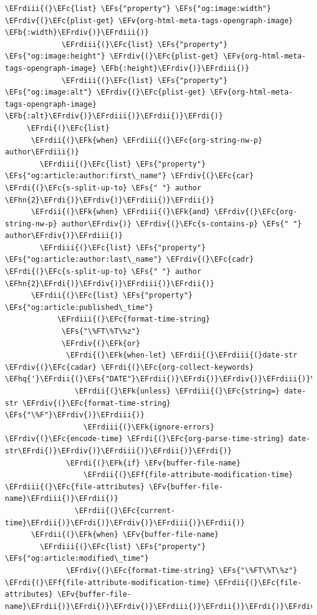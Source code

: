 \documentclass{scrartcl}
\newcommand{\EFk}[1]{\textcolor{EFk}{#1}} %
\newcommand{\EFs}[1]{\textcolor{EFs}{#1}} %
\newcommand{\EFb}[1]{\textcolor{EFb}{#1}} %
\newcommand{\EFc}[1]{\textcolor{EFc}{#1}} %
\newcommand{\EFv}[1]{\textcolor{EFv}{#1}} %
\newcommand{\EFf}[1]{\textcolor{EFf}{#1}} %
\newcommand{\EFhn}[1]{\textcolor{EFhn}{\textbf{#1}}} %
\newcommand{\EFhq}[1]{\textcolor{EFhq}{#1}} %
\newcommand{\EFrdi}[1]{\textcolor{EFrdi}{#1}} %
\newcommand{\EFrdii}[1]{\textcolor{EFrdii}{#1}} %
\newcommand{\EFrdiii}[1]{\textcolor{EFrdiii}{#1}} %
\newcommand{\EFrdiv}[1]{\textcolor{EFrdiv}{#1}} %
\begin{document}
\begin{Code}
\begin{Verbatim}[]
             \EFrdiii{(}\EFc{list} \EFs{"property"} \EFs{"og:image:width"} \EFrdiv{(}\EFc{plist-get} \EFv{org-html-meta-tags-opengraph-image} \EFb{:width}\EFrdiv{)}\EFrdiii{)}
             \EFrdiii{(}\EFc{list} \EFs{"property"} \EFs{"og:image:height"} \EFrdiv{(}\EFc{plist-get} \EFv{org-html-meta-tags-opengraph-image} \EFb{:height}\EFrdiv{)}\EFrdiii{)}
             \EFrdiii{(}\EFc{list} \EFs{"property"} \EFs{"og:image:alt"} \EFrdiv{(}\EFc{plist-get} \EFv{org-html-meta-tags-opengraph-image} \EFb{:alt}\EFrdiv{)}\EFrdiii{)}\EFrdii{)}\EFrdi{)}
     \EFrdi{(}\EFc{list}
      \EFrdii{(}\EFk{when} \EFrdiii{(}\EFc{org-string-nw-p} author\EFrdiii{)}
        \EFrdiii{(}\EFc{list} \EFs{"property"} \EFs{"og:article:author:first\_name"} \EFrdiv{(}\EFc{car} \EFrdi{(}\EFc{s-split-up-to} \EFs{" "} author \EFhn{2}\EFrdi{)}\EFrdiv{)}\EFrdiii{)}\EFrdii{)}
      \EFrdii{(}\EFk{when} \EFrdiii{(}\EFk{and} \EFrdiv{(}\EFc{org-string-nw-p} author\EFrdiv{)} \EFrdiv{(}\EFc{s-contains-p} \EFs{" "} author\EFrdiv{)}\EFrdiii{)}
        \EFrdiii{(}\EFc{list} \EFs{"property"} \EFs{"og:article:author:last\_name"} \EFrdiv{(}\EFc{cadr} \EFrdi{(}\EFc{s-split-up-to} \EFs{" "} author \EFhn{2}\EFrdi{)}\EFrdiv{)}\EFrdiii{)}\EFrdii{)}
      \EFrdii{(}\EFc{list} \EFs{"property"} \EFs{"og:article:published\_time"}
            \EFrdiii{(}\EFc{format-time-string}
             \EFs{"\%FT\%T\%z"}
             \EFrdiv{(}\EFk{or}
              \EFrdi{(}\EFk{when-let} \EFrdii{(}\EFrdiii{(}date-str \EFrdiv{(}\EFc{cadar} \EFrdi{(}\EFc{org-collect-keywords} \EFhq{'}\EFrdii{(}\EFs{"DATE"}\EFrdii{)}\EFrdi{)}\EFrdiv{)}\EFrdiii{)}\EFrdii{)}
                \EFrdii{(}\EFk{unless} \EFrdiii{(}\EFc{string=} date-str \EFrdiv{(}\EFc{format-time-string} \EFs{"\%F"}\EFrdiv{)}\EFrdiii{)}
                  \EFrdiii{(}\EFk{ignore-errors} \EFrdiv{(}\EFc{encode-time} \EFrdi{(}\EFc{org-parse-time-string} date-str\EFrdi{)}\EFrdiv{)}\EFrdiii{)}\EFrdii{)}\EFrdi{)}
              \EFrdi{(}\EFk{if} \EFv{buffer-file-name}
                  \EFrdii{(}\EFf{file-attribute-modification-time} \EFrdiii{(}\EFc{file-attributes} \EFv{buffer-file-name}\EFrdiii{)}\EFrdii{)}
                \EFrdii{(}\EFc{current-time}\EFrdii{)}\EFrdi{)}\EFrdiv{)}\EFrdiii{)}\EFrdii{)}
      \EFrdii{(}\EFk{when} \EFv{buffer-file-name}
        \EFrdiii{(}\EFc{list} \EFs{"property"} \EFs{"og:article:modified\_time"}
              \EFrdiv{(}\EFc{format-time-string} \EFs{"\%FT\%T\%z"} \EFrdi{(}\EFf{file-attribute-modification-time} \EFrdii{(}\EFc{file-attributes} \EFv{buffer-file-name}\EFrdii{)}\EFrdi{)}\EFrdiv{)}\EFrdiii{)}\EFrdii{)}\EFrdi{)}\EFrdiv{)}\EFrdiii{)}\EFrdii{)}


\end{Verbatim}
\end{Code}
\end{document}
